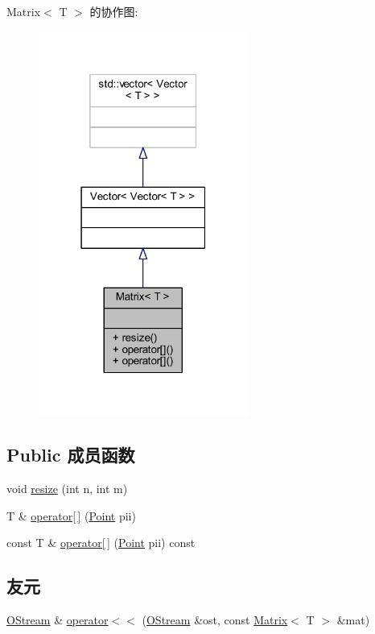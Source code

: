 Matrix$<$ T $>$ 的协作图\+:
\nopagebreak
\begin{figure}[H]
\begin{center}
\leavevmode
\includegraphics[width=195pt]{classMatrix__coll__graph}
\end{center}
\end{figure}
\subsection*{Public 成员函数}
\begin{DoxyCompactItemize}
\item 
void \hyperlink{classMatrix_a15ce96c8af4c7a982c2c10b96f29cea1}{resize} (int n, int m)
\item 
T \& \hyperlink{classMatrix_a8a7de06bb121fe2d6fe32708057a5f29}{operator\mbox{[}$\,$\mbox{]}} (\hyperlink{classPoint}{Point} pii)
\item 
const T \& \hyperlink{classMatrix_a26b02431e20f8d21a66aec834effcca1}{operator\mbox{[}$\,$\mbox{]}} (\hyperlink{classPoint}{Point} pii) const 
\end{DoxyCompactItemize}
\subsection*{友元}
\begin{DoxyCompactItemize}
\item 
\hyperlink{global_8h_a4fcce0eedf9be71754b55a7e7a6d7f50}{O\+Stream} \& \hyperlink{classMatrix_a27b4e4fa201d8e7b0eec27a409108518}{operator$<$$<$} (\hyperlink{global_8h_a4fcce0eedf9be71754b55a7e7a6d7f50}{O\+Stream} \&ost, const \hyperlink{classMatrix}{Matrix}$<$ T $>$ \&mat)
\end{DoxyCompactItemize}


